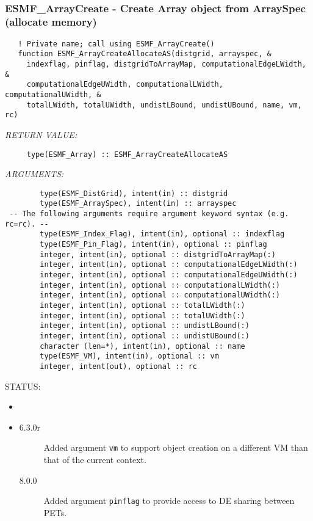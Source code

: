  
\mbox{}\hrulefill\ 
 
\subsubsection [ESMF\_ArrayCreate] {ESMF\_ArrayCreate - Create Array object from ArraySpec (allocate memory)}


\begin{verbatim}   ! Private name; call using ESMF_ArrayCreate()
   function ESMF_ArrayCreateAllocateAS(distgrid, arrayspec, &
     indexflag, pinflag, distgridToArrayMap, computationalEdgeLWidth, &
     computationalEdgeUWidth, computationalLWidth, computationalUWidth, &
     totalLWidth, totalUWidth, undistLBound, undistUBound, name, vm, rc)\end{verbatim}{\em RETURN VALUE:}
\begin{verbatim}     type(ESMF_Array) :: ESMF_ArrayCreateAllocateAS\end{verbatim}{\em ARGUMENTS:}
\begin{verbatim}        type(ESMF_DistGrid), intent(in) :: distgrid
        type(ESMF_ArraySpec), intent(in) :: arrayspec
 -- The following arguments require argument keyword syntax (e.g. rc=rc). --
        type(ESMF_Index_Flag), intent(in), optional :: indexflag
        type(ESMF_Pin_Flag), intent(in), optional :: pinflag
        integer, intent(in), optional :: distgridToArrayMap(:)
        integer, intent(in), optional :: computationalEdgeLWidth(:)
        integer, intent(in), optional :: computationalEdgeUWidth(:)
        integer, intent(in), optional :: computationalLWidth(:)
        integer, intent(in), optional :: computationalUWidth(:)
        integer, intent(in), optional :: totalLWidth(:)
        integer, intent(in), optional :: totalUWidth(:)
        integer, intent(in), optional :: undistLBound(:)
        integer, intent(in), optional :: undistUBound(:)
        character (len=*), intent(in), optional :: name
        type(ESMF_VM), intent(in), optional :: vm
        integer, intent(out), optional :: rc\end{verbatim}
{\sf STATUS:}
   \begin{itemize}
   \item{}
   \item{}
   \begin{description}
   \item[6.3.0r] Added argument {\tt vm} to support object creation on a
   different VM than that of the current context.
   \item[8.0.0] Added argument {\tt pinflag} to provide access to DE sharing
   between PETs.
   \end{description}
   \end{itemize}
  
